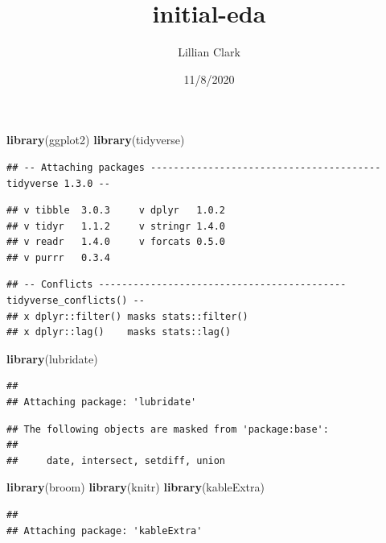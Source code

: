 \documentclass[]{article}
\title{initial-eda}
\author{Lillian Clark}
\date{11/8/2020}
\newenvironment{Shaded}{\begin{snugshade}}{\end{snugshade}}
\newcommand{\KeywordTok}[1]{\textcolor[rgb]{0.13,0.29,0.53}{\textbf{#1}}}
\newcommand{\NormalTok}[1]{#1}
\begin{document}
\maketitle

\begin{Shaded}
\begin{Highlighting}[]
\KeywordTok{library}\NormalTok{(ggplot2)}
\KeywordTok{library}\NormalTok{(tidyverse)}
\end{Highlighting}
\end{Shaded}

\begin{verbatim}
## -- Attaching packages ---------------------------------------- tidyverse 1.3.0 --
\end{verbatim}

\begin{verbatim}
## v tibble  3.0.3     v dplyr   1.0.2
## v tidyr   1.1.2     v stringr 1.4.0
## v readr   1.4.0     v forcats 0.5.0
## v purrr   0.3.4
\end{verbatim}

\begin{verbatim}
## -- Conflicts ------------------------------------------- tidyverse_conflicts() --
## x dplyr::filter() masks stats::filter()
## x dplyr::lag()    masks stats::lag()
\end{verbatim}

\begin{Shaded}
\begin{Highlighting}[]
\KeywordTok{library}\NormalTok{(lubridate)}
\end{Highlighting}
\end{Shaded}

\begin{verbatim}
## 
## Attaching package: 'lubridate'
\end{verbatim}

\begin{verbatim}
## The following objects are masked from 'package:base':
## 
##     date, intersect, setdiff, union
\end{verbatim}

\begin{Shaded}
\begin{Highlighting}[]
\KeywordTok{library}\NormalTok{(broom)}
\KeywordTok{library}\NormalTok{(knitr)}
\KeywordTok{library}\NormalTok{(kableExtra)}
\end{Highlighting}
\end{Shaded}

\begin{verbatim}
## 
## Attaching package: 'kableExtra'
\end{verbatim}
\end{document}
